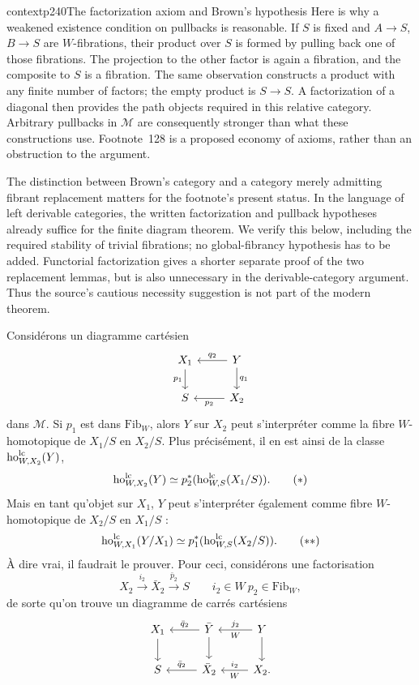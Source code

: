 \begin{dcomment}{context}{p240}{The factorization axiom and Brown's hypothesis}
Here is why a weakened existence condition on pullbacks is reasonable. If $S$ is fixed and $A\to S$, $B\to S$ are $W$-fibrations, their product over $S$ is formed by pulling back one of those fibrations. The projection to the other factor is again a fibration, and the composite to $S$ is a fibration. The same observation constructs a product with any finite number of factors; the empty product is $S\to S$. A factorization of a diagonal then provides the path objects required in this relative category. Arbitrary pullbacks in $\mathcal M$ are consequently stronger than what these constructions use. Footnote~128 is a proposed economy of axioms, rather than an obstruction to the argument.

The distinction between Brown's category and a category merely admitting fibrant replacement matters for the footnote's present status. In the language of left derivable categories, the written factorization and pullback hypotheses already suffice for the finite diagram theorem. We verify this below, including the required stability of trivial fibrations; no global-fibrancy hypothesis has to be added. Functorial factorization gives a shorter separate proof of the two replacement lemmas, but is also unnecessary in the derivable-category argument. Thus the source's cautious necessity suggestion is not part of the modern theorem.
\end{dcomment}


Considérons un diagramme cartésien
\[
\begin{tikzcd}[ampersand replacement=\&]
X_1 \arrow[d, "p_1"'] \& Y \arrow[l, "q_2"'] \arrow[d, "q_1"] \\
S \& X_2 \arrow[l, "p_2"]
\end{tikzcd}
\]
dans $\mathcal{M}$. Si $p_1$ est dans $\mathrm{Fib}_W$, alors $Y$ sur $X_2$ peut s'interpréter comme la fibre $W$-homotopique de $X_1/S$ en $X_2/S$. Plus précisément, il en est ainsi de la classe $\mathrm{ho}^{\mathrm{lc}}_{W,X_2}(Y)$,
\[
\mathrm{ho}^{\mathrm{lc}}_{W,X_2}(Y) \simeq p_2^*(\mathrm{ho}^{\mathrm{lc}}_{W,S}(X_1/S)). \tag*{$(*)$}
\]
Mais en tant qu'objet sur $X_1$, $Y$ peut s'interpréter également comme fibre $W$-homotopique de $X_2/S$ en $X_1/S$ :
\[
\mathrm{ho}^{\mathrm{lc}}_{W,X_1}(Y/X_1) \simeq p_1^*(\mathrm{ho}^{\mathrm{lc}}_{W,S}(X_2/S)). \tag*{$(**)$}
\]
À dire vrai, il faudrait le prouver. Pour ceci, considérons une factorisation
\[
X_2 \xrightarrow{i_2} \bar{X}_2 \xrightarrow{\bar{p}_2} S \qquad i_2 \in W\ p_2 \in \mathrm{Fib}_W, %
\]
de sorte qu'on trouve un diagramme de carrés cartésiens
\[
\begin{tikzcd}[ampersand replacement=\&]
X_1 \arrow[d] \& \bar{Y} \arrow[l, "\bar{q}_2"'] \arrow[d] \& Y \arrow[l, "j_2"', "W"] \arrow[d] \\
S \& \bar{X}_2 \arrow[l, "\bar{q}_2"'] \& X_2. \arrow[l, "i_2"', "W"] %
\end{tikzcd}
\]

